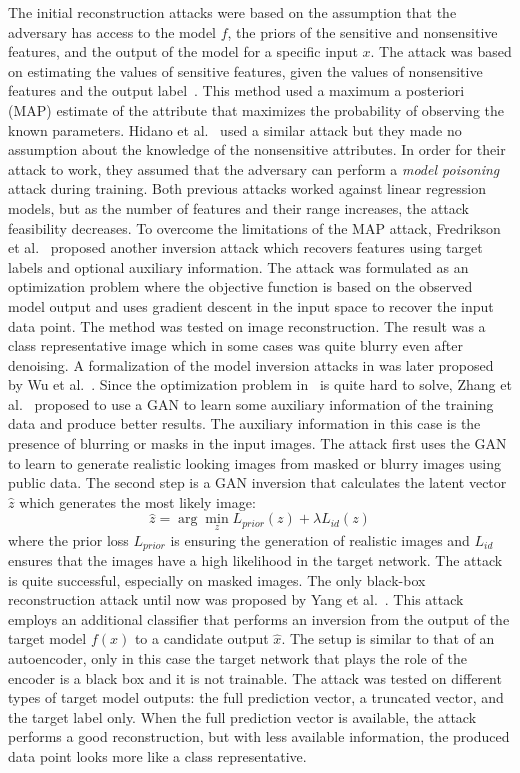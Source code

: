 The initial reconstruction attacks were based on the assumption that the adversary has access to the model $f$, the priors of the sensitive and nonsensitive features, and the output of the model for a specific input $x$. The attack was based on estimating the values of sensitive features, given the values of nonsensitive features and the output label~. This method used a maximum a posteriori (MAP) estimate of the attribute that maximizes the probability of observing the known parameters.
Hidano et al.~ used a similar attack but they made no assumption about the knowledge of the nonsensitive attributes. In order for their attack to work, they assumed that the adversary can perform a \textit{model poisoning} attack during training.
Both previous attacks worked against linear regression models, but as the number of features and their range increases, the attack feasibility decreases. To overcome the limitations of the MAP attack, Fredrikson et al.~ proposed another inversion attack which recovers features using target labels and optional auxiliary information. The attack was formulated as an optimization problem where the objective function is based on the observed model output and uses gradient descent in the input space to recover the input data point. The method was tested on image reconstruction. The result was a class representative image which in some cases was quite blurry even after denoising. A formalization of the model inversion attacks in  was later proposed by Wu et al.~. 
Since the optimization problem in~ is quite hard to solve, Zhang et al.~ proposed to use a GAN to learn some auxiliary information of the training data and produce better results. The auxiliary information in this case is the presence of blurring or masks in the input images. The attack first uses the GAN to learn to generate realistic looking images from masked or blurry images using public data. The second step is a GAN inversion that calculates the latent vector $\hat{z}$ which generates the most likely image: 
\begin{equation}
  \hat{z}=\arg\min_z L_{prior}(z) + \lambda L_{id}(z)  
\end{equation}
where the prior loss $L_{prior}$ is ensuring the generation of realistic images and $L_{id}$ ensures that the images have a high likelihood in the target network. The attack is quite successful, especially on masked images.
The only black-box reconstruction attack until now was proposed by Yang et al.~. This attack employs an additional classifier that performs an inversion from the output of the target model $f(x)$ to a candidate output $\hat{x}$. The setup is similar to that of an autoencoder, only in this case the target network that plays the role of the encoder is a black box and it is not trainable. The attack was tested on different types of target model outputs: the full prediction vector, a truncated vector, and the target label only. When the full prediction vector is available, the attack performs a good reconstruction, but with less available information, the produced data point looks more like a class representative.

